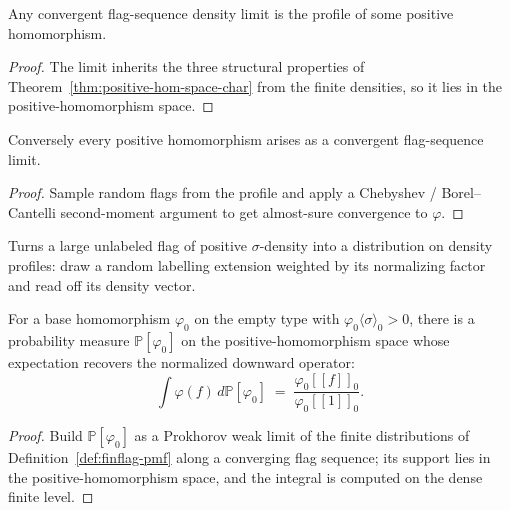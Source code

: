 \begin{theorem}
  \label{thm:limit-is-hom}
  \leanok
  Any convergent flag-sequence density limit is the profile of some positive
  homomorphism.
\end{theorem}
\begin{proof}\leanok
  The limit inherits the three structural properties of
  Theorem~\ref{thm:positive-hom-space-char} from the finite densities, so it lies
  in the positive-homomorphism space.
\end{proof}

\begin{theorem}
  \label{thm:hom-is-limit}
  \leanok
  Conversely every positive homomorphism arises as a convergent flag-sequence
  limit.
\end{theorem}
\begin{proof}\leanok
  Sample random flags from the profile and apply a Chebyshev / Borel--Cantelli
  second-moment argument to get almost-sure convergence to $\varphi$.
\end{proof}

\begin{definition}
  \label{def:finflag-pmf}
  \leanok
  Turns a large unlabeled flag of positive $\sigma$-density into a distribution
  on density profiles: draw a random labelling extension weighted by its
  normalizing factor and read off its density vector.
\end{definition}

\begin{theorem}
  \label{thm:random-hom-measure}
  \leanok
  For a base homomorphism $\varphi_0$ on the empty type with
  $\varphi_0\langle\sigma\rangle_0 > 0$, there is a probability measure
  $\mathbb{P}[\varphi_0]$ on the positive-homomorphism space whose expectation
  recovers the normalized downward operator:
  \[ \int \varphi(f)\, d\mathbb{P}[\varphi_0]
     \;=\; \frac{\varphi_0[\![f]\!]_0}{\varphi_0[\![1]\!]_0}. \]
\end{theorem}
\begin{proof}\leanok
  Build $\mathbb{P}[\varphi_0]$ as a Prokhorov weak limit of the finite
  distributions of Definition~\ref{def:finflag-pmf} along a converging flag
  sequence; its support lies in the positive-homomorphism space, and the integral
  is computed on the dense finite level.
\end{proof}

